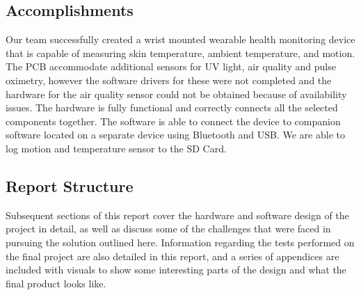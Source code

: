 \subsection{Accomplishments}

Our team successfully created a wrist mounted wearable health monitoring device
that is capable of measuring skin temperature, ambient temperature, and motion.
The PCB accommodate additional sensors for UV light, air quality
and pulse oximetry, however the software drivers for these were not completed 
and the hardware for the air quality sensor could not be obtained because of 
availability issues. The hardware is fully functional and correctly
connects all the selected components together.  The software is able to connect
the device to companion software located on a separate device using Bluetooth
and USB.  We are able to log motion and temperature sensor to the SD Card.

\subsection{Report Structure}
Subsequent sections of this
report cover the hardware and software design of the project in detail, as well
as discuss some of the challenges that were faced in pursuing the solution
outlined here. Information regarding the tests performed on the final project
are also detailed in this report, and a series of appendices are included with
visuals to show some interesting parts of the design and what the final product
looks like.
